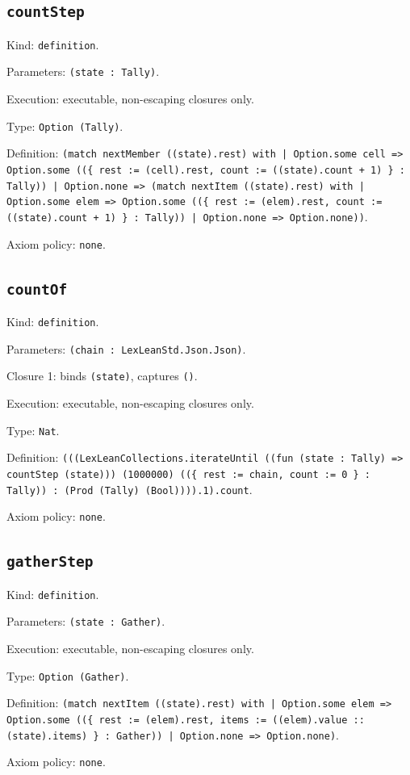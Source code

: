 \documentclass[11pt]{article}
\begin{document}
\subsection*{\texttt{countStep}}
\noindent Kind: \texttt{definition}.\par
\noindent Parameters: \texttt{(state : Tally)}.\par
\noindent Execution: executable, non-escaping closures only.\par
\noindent Type: \texttt{Option (Tally)}.\par
\noindent Definition: \texttt{(match nextMember ((state).rest) with | Option.some cell => Option.some ((\{ rest := (cell).rest, count := ((state).count + 1) \} : Tally)) | Option.none => (match nextItem ((state).rest) with | Option.some elem => Option.some ((\{ rest := (elem).rest, count := ((state).count + 1) \} : Tally)) | Option.none => Option.none))}.\par
\noindent Axiom policy: \texttt{none}.\par
\subsection*{\texttt{countOf}}
\noindent Kind: \texttt{definition}.\par
\noindent Parameters: \texttt{(chain : LexLeanStd.Json.Json)}.\par
\noindent Closure 1: binds \texttt{(state)}, captures \texttt{()}.\par
\noindent Execution: executable, non-escaping closures only.\par
\noindent Type: \texttt{Nat}.\par
\noindent Definition: \texttt{(((LexLeanCollections.iterateUntil ((fun (state : Tally) => countStep (state))) (1000000) ((\{ rest := chain, count := 0 \} : Tally)) : (Prod (Tally) (Bool)))).1).count}.\par
\noindent Axiom policy: \texttt{none}.\par
\subsection*{\texttt{gatherStep}}
\noindent Kind: \texttt{definition}.\par
\noindent Parameters: \texttt{(state : Gather)}.\par
\noindent Execution: executable, non-escaping closures only.\par
\noindent Type: \texttt{Option (Gather)}.\par
\noindent Definition: \texttt{(match nextItem ((state).rest) with | Option.some elem => Option.some ((\{ rest := (elem).rest, items := ((elem).value :: (state).items) \} : Gather)) | Option.none => Option.none)}.\par
\noindent Axiom policy: \texttt{none}.\par
\end{document}
